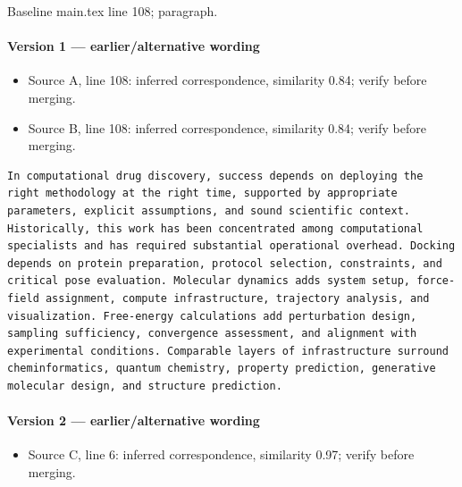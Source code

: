 \documentclass[11pt]{article}
\begin{document}
Baseline main.tex line 108; paragraph.

\paragraph{Version 1 --- earlier/alternative wording}

\begin{itemize}[leftmargin=*]
\item Source A, line 108: inferred correspondence, similarity 0.84; verify before merging.
\item Source B, line 108: inferred correspondence, similarity 0.84; verify before merging.
\end{itemize}

\begin{lstlisting}
In computational drug discovery, success depends on deploying the right methodology at the right time, supported by appropriate parameters, explicit assumptions, and sound scientific context. Historically, this work has been concentrated among computational specialists and has required substantial operational overhead. Docking depends on protein preparation, protocol selection, constraints, and critical pose evaluation. Molecular dynamics adds system setup, force-field assignment, compute infrastructure, trajectory analysis, and visualization. Free-energy calculations add perturbation design, sampling sufficiency, convergence assessment, and alignment with experimental conditions. Comparable layers of infrastructure surround cheminformatics, quantum chemistry, property prediction, generative molecular design, and structure prediction.
\end{lstlisting}

\paragraph{Version 2 --- earlier/alternative wording}

\begin{itemize}[leftmargin=*]
\item Source C, line 6: inferred correspondence, similarity 0.97; verify before merging.
\end{itemize}
\end{document}
